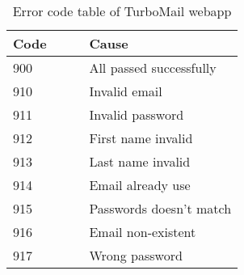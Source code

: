 \documentclass{article}
\begin{document}
\begin{table}[ht]
  \centering
  \begin{tabular}{p{0.33\linewidth}p{0.67\linewidth}}
    \hline
    \textbf{Code} & \textbf{Cause} \\
    \hline
    900 & All passed successfully \\
    910 & Invalid email \\
    911 & Invalid password \\
    912 & First name invalid \\
    913 & Last name invalid \\
    914 & Email already use \\
    915 & Passwords doesn't match \\
    916 & Email non-existent \\
    917 & Wrong password \\
    \hline
  \end{tabular}
  \caption{Error code table of TurboMail webapp}
  \label{tab:error-code}
\end{table}
\end{document}
